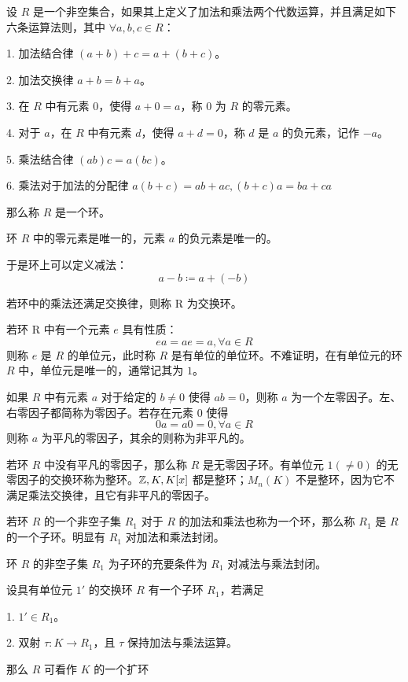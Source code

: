 \begin{definition}[环]
    设 $R$ 是一个非空集合，如果其上定义了加法和乘法两个代数运算，并且满足如下六条运算法则，其中 $\forall a,b,c\in R$：

    1. 加法结合律 $(a+b)+c = a+(b+c)$。

    2. 加法交换律 $a+b = b+a$。

    3. 在 $R$ 中有元素 $0$，使得 $a+0=a$，称 $0$ 为 $R$ 的零元素。

    4. 对于 $a$，在 $R$ 中有元素 $d$，使得 $a+d=0$，称 $d$ 是 $a$ 的负元素，记作 $-a$。

    5. 乘法结合律 $(ab)c = a(bc)$。

    6. 乘法对于加法的分配律 $a(b+c) = ab+ac,(b+c)a = ba+ca$

    那么称 $R$ 是一个环。
\end{definition}

\begin{theorem}
    环 $R$ 中的零元素是唯一的，元素 $a$ 的负元素是唯一的。
\end{theorem}

于是环上可以定义减法：
\[a-b \coloneqq  a + (-b)\]

若环中的乘法还满足交换律，则称 R 为交换环。

若环 R 中有一个元素 $e$ 具有性质：
\[ea = ae  = a, \forall a \in R\]
则称 $e$ 是 $R$ 的单位元，此时称 $R$ 是有单位的单位环。不难证明，在有单位元的环 $R$ 中，单位元是唯一的，通常记其为 $1$。

如果 $R$ 中有元素 $a$ 对于给定的 $b \ne 0$ 使得 $ab=0$，则称 $a$ 为一个左零因子。左、右零因子都简称为零因子。若存在元素 $0$ 使得
\[0a=a0=0, \forall a \in R\]
则称 $a$ 为平凡的零因子，其余的则称为非平凡的。

若环 $R$ 中没有平凡的零因子，那么称 $R$ 是无零因子环。有单位元 $1(\ne 0)$ 的无零因子的交换环称为整环。$\mathbb{Z},K,K[x]$ 都是整环；$M_n(K)$ 不是整环，因为它不满足乘法交换律，且它有非平凡的零因子。

若环 $R$ 的一个非空子集 $R_1$ 对于 $R$ 的加法和乘法也称为一个环，那么称 $R_1$ 是 $R$ 的一个子环。明显有 $R_1$ 对加法和乘法封闭。

\begin{theorem}
    环 $R$ 的非空子集 $R_1$ 为子环的充要条件为 $R_1$ 对减法与乘法封闭。
\end{theorem}

\begin{definition}
    设具有单位元 $1'$ 的交换环 $R$ 有一个子环 $R_1$，若满足

    1. $1' \in R_1$。

    2. 双射 $\tau : K \to R_1$，且 $\tau$ 保持加法与乘法运算。

    那么 $R$ 可看作 $K$ 的一个扩环
\end{definition}

